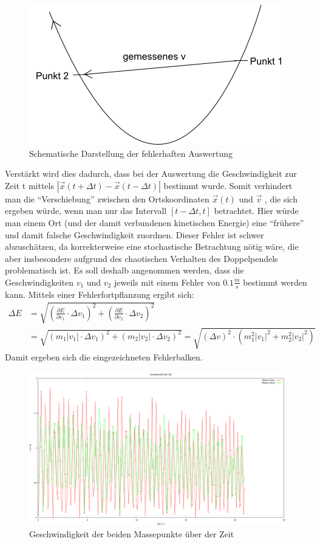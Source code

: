 \begin{figure}
        \includegraphics[width=.7\textwidth]{images/grafik1.png}
\caption{Schematische Darstellung der fehlerhaften Auswertung}
\label{grafik1}
\end{figure}


Verstärkt wird dies dadurch, dass bei der Auswertung die Geschwindigkeit zur Zeit t mittels $ |\vec{x}(t+\Delta t) - \vec{x}(t-\Delta t)| $ bestimmt wurde. Somit verhindert man die \enquote{Verschiebung} zwischen den Ortskoordinaten $  \vec{x} (t) $ und $ \vec{v} $ , die sich ergeben würde, wenn man nur das Intervall $ [t - \Delta t, t] $ betrachtet. Hier würde man einem Ort (und der damit verbundenen kinetischen Energie) eine \enquote{frühere} und damit falsche Geschwindigkeit zuordnen. 
Dieser Fehler ist schwer abzuschätzen, da korrekterweise eine stochastische Betrachtung nötig wäre, die aber insbesondere aufgrund des chaotischen Verhalten des Doppelpendels problematisch ist. 
Es soll deshalb angenommen werden, dass die Geschwindigkeiten $ v_1 $ und $ v_2 $ jeweils mit einem Fehler von $ 0.1 \frac{m}{s} $ bestimmt werden kann. Mittels einer Fehlerfortpflanzung ergibt sich: 
\begin{align}
\Delta E &= \sqrt{(\frac{\partial E}{\partial v_1} \cdot \Delta v_1)^2 + (\frac{\partial E}{\partial v_2} \cdot \Delta v_2)^2} \nonumber\\
&= \sqrt{(m_1 |v_1| \cdot \Delta v_1)^2 + (m_2 |v_2| \cdot \Delta v_2)^2} = \sqrt{(\Delta v)^2 \cdot (m_1^2 |v_1|^2 + m_2^2 |v_2|^2)}
\end{align}
Damit ergeben sich die eingezeichneten Fehlerbalken. 


\begin{figure}
        \includegraphics[width=.9\textwidth]{images/v_ueber_t.png}
\caption{Geschwindigkeit der beiden Massepunkte über der Zeit}
\label{v_ueber_t}
\end{figure}



